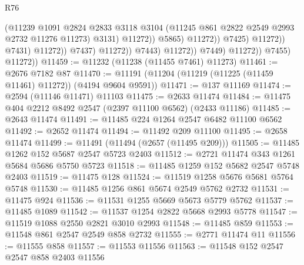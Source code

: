 \begin{lexlean}{R76}
\begin{coremodule}
                                                  (@11239
                                                    @1091
                                                    @2824
                                                    @2833
                                                    @3118
                                                    @3104
                                                    (@11245
                                                      @861
                                                      @2822
                                                      @2549
                                                      @2993
                                                      @2732
                                                      @11276
                                                      @11273)
                                                    @3131)
                                                  @11272))
                                              @5865)
                                            @11272))
                                        @7425)
                                      @11272))
                                  @7431)
                                @11272))
                            @7437)
                          @11272))
                      @7443)
                    @11272))
                @7449)
              @11272))
          @7455)
        @11272))
@11459 := @11232 (@11238 (@11455 @7461) @11273)
@11461 := @2676 @7182 @87
@11470 := @11191 (@11204 (@11219 (@11225 (@11459 @11461) @11272)) (@4194 @9604 @9591))
@11471 := @137 @11169
@11474 := @2594 (@11146 @11471) @11103
@11475 := @2633 @11474
@11484 := @11475 @404 @2212 @8492 @2547 (@2397 @11100 @6562) (@2433 @11186)
@11485 := @2643 @11474
@11491 := @11485 @224 @1264 @2547 @6482 @11100 @6562
@11492 := @2652 @11474
@11494 := @11492 @209 @11100
@11495 := @2658 @11474
@11499 := @11491 (@11494 (@2657 (@11495 @209)))
@11505 := @11485 @1262 @152 @5687 @2547 @5723 @2403
@11512 := @2721 @11474 @343 @1261 @5684 @5686 @5750 @5723
@11518 := @11485 @1259 @152 @5682 @2547 @5748 @2403
@11519 := @11475 @128
@11524 := @11519 @1258 @5676 @5681 @5764 @5748
@11530 := @11485 @1256 @861 @5674 @2549 @5762 @2732
@11531 := @11475 @924
@11536 := @11531 @1255 @5669 @5673 @5779 @5762
@11537 := @11485 @1089
@11542 := @11537 @1254 @2822 @5668 @2993 @5778
@11547 := @11519 @1088 @2550 @2821 @3010 @2993
@11548 := @11485 @859
@11553 := @11548 @861 @2547 @2549 @858 @2732
@11555 := @2771 @11474 @11
@11556 := @11555 @858
@11557 := @11553 @11556
@11563 := @11548 @152 @2547 @2547 @858 @2403 @11556

\end{coremodule}
\end{lexlean}
